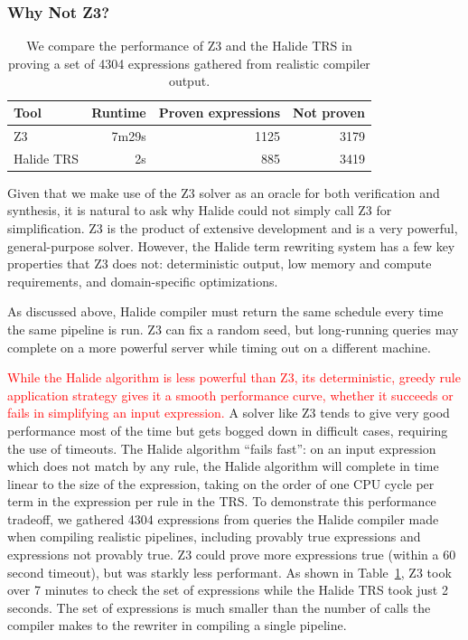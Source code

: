 \documentclass[acmsmall,review]{acmart}\settopmatter{printfolios=true,printccs=false,printacmref=false}
\newcommand{\modified}[1]{\textcolor{red}{{#1}}}
\begin{document}
\subsubsection{Why Not Z3?}
\begin{table}
\caption{We compare the performance of Z3 and the Halide TRS in proving a set of 4304 expressions gathered from realistic compiler output.}
\begin{tabular}{l|r|r|r}
Tool & Runtime & Proven expressions & Not proven \\
\hline
Z3 & 7m29s & 1125 & 3179 \\
Halide TRS & 2s & 885 & 3419 
\end{tabular}
\label{tab:simplifiervsz3}
\end{table}


Given that we make use of the Z3 solver as an oracle for both verification and synthesis, it is natural to ask why Halide could not simply call Z3 for simplification. Z3 is the product of extensive development and is a very powerful, general-purpose solver. However, the Halide term rewriting system has a few key properties that Z3 does not: deterministic output, low memory and compute requirements, and domain-specific optimizations.

As discussed above, Halide compiler must return the same schedule every time the same pipeline is run. Z3 can fix a random seed, but long-running queries may complete on a more powerful server while timing out on a different machine.

\modified{While the Halide algorithm is less powerful than Z3, its deterministic, greedy rule application strategy
gives it a smooth performance curve, whether it succeeds or fails in simplifying an input expression. }
A solver like Z3 tends to give very good performance most of the time but gets bogged down in difficult cases, requiring the use of timeouts. The Halide algorithm ``fails fast'': on an input expression which does not match by any rule,  the Halide algorithm will complete in time linear to the size of the expression, taking on the order of one CPU cycle per term in the expression per rule in the TRS. To demonstrate this performance tradeoff, we gathered 4304 expressions from queries the Halide compiler made when compiling realistic pipelines, including provably true expressions and expressions not provably true. Z3 could prove more expressions true (within a 60 second timeout), but was starkly less performant. As shown in Table~\ref{tab:simplifiervsz3}, Z3 took over 7 minutes to check the set of expressions while the Halide TRS took just 2 seconds. The set of expressions is much smaller than the number of calls the compiler makes to the rewriter in compiling a single pipeline.
\end{document}
